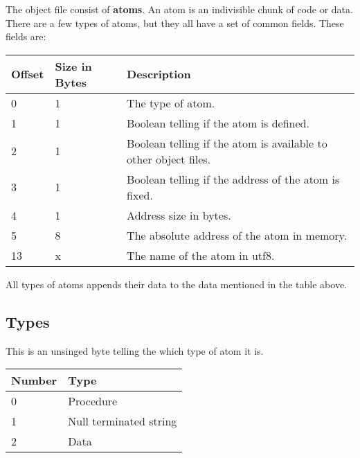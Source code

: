 The object file consist of \textbf{atoms}. An atom is an indivisible chunk of
code or data. There are a few types of atoms, but they all have a set of common
fields. These fields are:

\begin{table}[h]
    \centering
    \label{tbl:atom}
    \begin{tabular}{|l|l|l|}
        \hline
        \textbf{Offset} & \textbf{Size in Bytes} & \textbf{Description}                                            \\ \hline
        0               & 1                      & The type of atom.                                               \\ \hline
        1               & 1                      & Boolean telling if the atom is defined.                         \\ \hline
        2               & 1                      & Boolean telling if the atom is available to other object files. \\ \hline
        3               & 1                      & Boolean telling if the address of the atom is fixed.            \\ \hline
        4               & 1                      & Address size in bytes.                                          \\ \hline
        5               & 8                      & The absolute address of the atom in memory.                     \\ \hline
        13              & x                      & The name of the atom in utf8.                                   \\ \hline
    \end{tabular}
\end{table}

All types of atoms appends their data to the data mentioned in the table above.

\subsection{Types}
This is an unsinged byte telling the which type of atom it is.

\begin{table}[h]
    \centering
    \label{tbl:type}
    \begin{tabular}{|l|l|}
        \hline
        \textbf{Number} & \textbf{Type}          \\ \hline
        0               & Procedure              \\ \hline
        1               & Null terminated string \\ \hline
        2               & Data                   \\ \hline
    \end{tabular}
\end{table}

